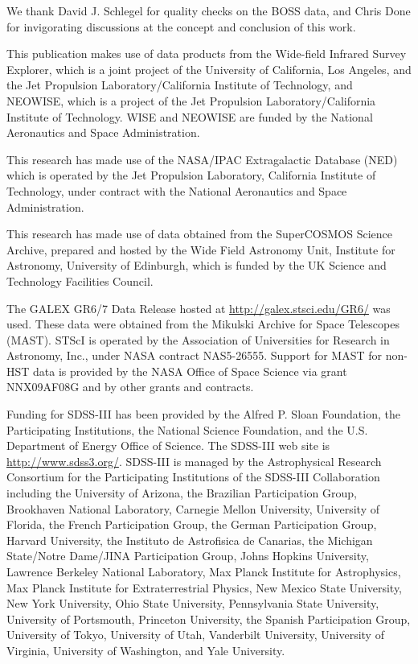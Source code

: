 \documentclass[a4paper,fleqn,usenatbib]{mnras}
\begin{document}
We thank David J. Schlegel for quality checks on the BOSS data, and
Chris Done for invigorating discussions at the concept and conclusion
of this work.

This publication makes use of data products from the Wide-field
Infrared Survey Explorer, which is a joint project of the University
of California, Los Angeles, and the Jet Propulsion
Laboratory/California Institute of Technology, and NEOWISE, which is a
project of the Jet Propulsion Laboratory/California Institute of
Technology. WISE and NEOWISE are funded by the National Aeronautics
and Space Administration.

This research has made use of the NASA/IPAC Extragalactic Database
(NED) which is operated by the Jet Propulsion Laboratory, California
Institute of Technology, under contract with the National Aeronautics
and Space Administration.

This research has made use of data obtained from the SuperCOSMOS
Science Archive, prepared and hosted by the Wide Field Astronomy Unit,
Institute for Astronomy, University of Edinburgh, which is funded by
the UK Science and Technology Facilities Council.

The GALEX GR6/7 Data Release hosted at
\href{http://galex.stsci.edu/GR6/}{http://galex.stsci.edu/GR6/} was
used. These data were obtained from the Mikulski Archive for Space
Telescopes (MAST). STScI is operated by the Association of
Universities for Research in Astronomy, Inc., under NASA contract
NAS5-26555. Support for MAST for non-HST data is provided by the NASA
Office of Space Science via grant NNX09AF08G and by other grants and
contracts.

Funding for SDSS-III has been provided by the Alfred P. Sloan
Foundation, the Participating Institutions, the National Science
Foundation, and the U.S. Department of Energy Office of Science. The
SDSS-III web site is
\href{http://www.sdss3.org/}{http://www.sdss3.org/}.
SDSS-III is managed by the Astrophysical Research Consortium for the
Participating Institutions of the SDSS-III Collaboration including the
University of Arizona, the Brazilian Participation Group, Brookhaven
National Laboratory, Carnegie Mellon University, University of
Florida, the French Participation Group, the German Participation
Group, Harvard University, the Instituto de Astrofisica de Canarias,
the Michigan State/Notre Dame/JINA Participation Group, Johns Hopkins
University, Lawrence Berkeley National Laboratory, Max Planck
Institute for Astrophysics, Max Planck Institute for Extraterrestrial
Physics, New Mexico State University, New York University, Ohio State
University, Pennsylvania State University, University of Portsmouth,
Princeton University, the Spanish Participation Group, University of
Tokyo, University of Utah, Vanderbilt University, University of
Virginia, University of Washington, and Yale University.




\bsp	%
\label{lastpage}
\end{document}
